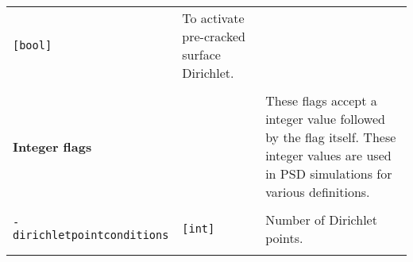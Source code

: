 \begin{longtable}[]{@{}lll@{}}
\begin{minipage}[t]{0.09\columnwidth}
\lstinline![bool]!\strut
\end{minipage} & \begin{minipage}[t]{0.56\columnwidth}\raggedright\strut
To activate pre-cracked surface Dirichlet.\strut
\end{minipage}\tabularnewline
\begin{minipage}[t]{0.26\columnwidth}\raggedright\strut
\strut
\end{minipage} & \begin{minipage}[t]{0.09\columnwidth}\raggedright\strut
\strut
\end{minipage} & \begin{minipage}[t]{0.56\columnwidth}\raggedright\strut
\strut
\end{minipage}\tabularnewline
\begin{minipage}[t]{0.26\columnwidth}\raggedright\strut
\textbf{Integer flags}\strut
\end{minipage} & \begin{minipage}[t]{0.09\columnwidth}\raggedright\strut
\strut
\end{minipage} & \begin{minipage}[t]{0.56\columnwidth}\raggedright\strut
These flags accept a integer value followed by the flag itself. These
integer values are used in PSD simulations for various
definitions.\strut
\end{minipage}\tabularnewline
\begin{minipage}[t]{0.26\columnwidth}\raggedright\strut
\strut
\end{minipage} & \begin{minipage}[t]{0.09\columnwidth}\raggedright\strut
\strut
\end{minipage} & \begin{minipage}[t]{0.56\columnwidth}\raggedright\strut
\strut
\end{minipage}\tabularnewline
\begin{minipage}[t]{0.26\columnwidth}\raggedright\strut
\lstinline!-dirichletpointconditions!\strut
\end{minipage} & \begin{minipage}[t]{0.09\columnwidth}\raggedright\strut
\lstinline![int]!\strut
\end{minipage} & \begin{minipage}[t]{0.56\columnwidth}\raggedright\strut
Number of Dirichlet points.\strut
\end{minipage}\tabularnewline
\begin{minipage}[t]{0.26\columnwidth}\raggedright\strut

\end{minipage}
\end{longtable}
